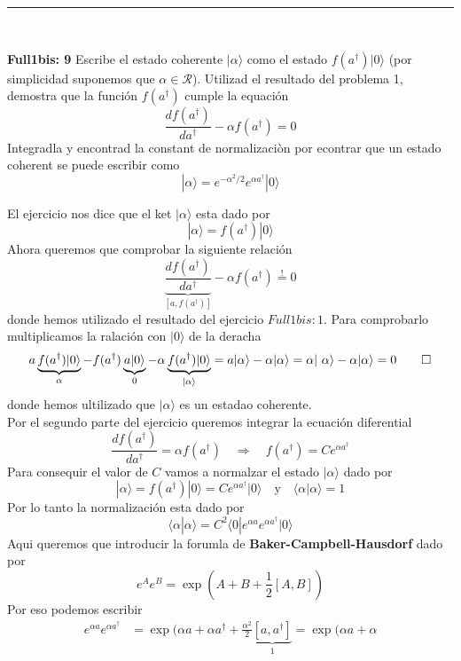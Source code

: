 \noindent\rule{\textwidth}{1px}\\

\begin{ejercicio}
\textbf{Full1bis: 9}
	Escribe el estado coherente $|\alpha\rangle$ como el estado
$f(a^\dagger)|0\rangle$ (por simplicidad suponemos que $\alpha \in
\mathcal{R}$). Utilizad el resultado del problema 1, demostra que la función
$f(a^\dagger)$ cumple la equación
$$
	\frac{d f(a^\dagger)}{d a^\dagger} - \alpha f(a^\dagger) = 0
$$
Integradla y encontrad la constant de normalizaciòn por econtrar que un estado
coherent se puede escribir como
$$
	|\alpha \rangle = e^{-\alpha^2/2} e^{\alpha a^\dagger} | 0\rangle
$$
\end{ejercicio}
\begin{solucion}
El ejercicio nos dice que el ket $|\alpha\rangle$ esta dado por
$$
	|\alpha\rangle = f(a^\dagger)|0\rangle
$$
Ahora queremos que comprobar la siguiente relación
$$
	\underbrace{\frac{d f(a^\dagger)}{d a^\dagger}}_{[a, f(a^\dagger)]} - \alpha f(a^\dagger) \overset{!}{=} 0
$$
donde hemos utilizado el resultado del ejercicio $Full1bis: 1$. Para comprobarlo
multiplicamos la ralación con $|0\rangle$ de la deracha
$$
	a \underbrace{f(a^\dagger)|0\rangle}_{\alpha} - f(a^\dagger)
\underbrace{a|0\rangle}_{0} -\alpha
\underbrace{f(a^\dagger)|0\rangle}_{|\alpha\rangle} = a | \alpha \rangle -
\alpha | \alpha \rangle = \alpha | \alpha \rangle - \alpha | \alpha \rangle = 0
\qed
$$
donde hemos ultilizado que $|\alpha\rangle$ es un estadao coherente. \\
Por el segundo parte del ejercicio queremos integrar la ecuación diferential 
$$
	\frac{d f(a^\dagger)}{d a^\dagger} = \alpha f(a^\dagger) \quad \Rightarrow
\quad f(a^\dagger) = C e^{\alpha a^\dagger}
$$
Para consequir el valor de $C$ vamos a normalzar el estado $|\alpha\rangle$ dado
por
$$
	|\alpha\rangle = f(a^\dagger) | 0\rangle = C e^{\alpha a^\dagger} | 0
\rangle \quad \text{y} \quad \langle \alpha | \alpha \rangle = 1
$$
Por lo tanto la normalización esta dado por
$$
	\langle \alpha | \alpha \rangle = C^2 \langle 0 | e^{\alpha a} e^{\alpha
a^\dagger} | 0\rangle
$$
Aqui queremos que introducir la forumla de \textbf{Baker-Campbell-Hausdorf} dado
por
$$
	e^A e^B = \exp(A+B+\frac{1}{2}[A,B])
$$
Por eso podemos escribir
\begin{align*}
	e^{\alpha a} e^{\alpha a^\dagger} &= \exp(\alpha a + \alpha a^\dagger +
\frac{\alpha^2}{2} \underbrace{[a, a^\dagger]}_1 = \exp(\alpha a + \alpha

\end{align*}
\end{solucion}
